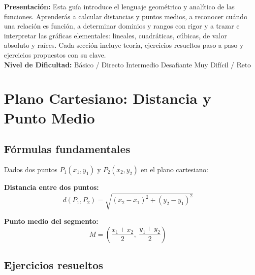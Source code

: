 \documentclass[12pt, letterpaper]{article}
\begin{document}

\vspace{4pt}
\begin{cuadroinfo}
  \small
  \textbf{Presentación:} Esta guía introduce el lenguaje geométrico y analítico de las funciones. Aprenderás a calcular distancias y puntos medios, a reconocer cuándo una relación es función, a determinar dominios y rangos con rigor y a trazar e interpretar las gráficas elementales: lineales, cuadráticas, cúbicas, de valor absoluto y raíces. Cada sección incluye teoría, ejercicios resueltos paso a paso y ejercicios propuestos con su clave.
  \\[4pt]
  \textbf{Nivel de Dificultad:}\quad
  \facil{} Básico / Directo \quad
  \medio{} Intermedio \quad
  \dificil{} Desafiante \quad
  \muyDificil{} Muy Difícil / Reto
\end{cuadroinfo}

\vspace{8pt}

\section{Plano Cartesiano: Distancia y Punto Medio}

\subsection{Fórmulas fundamentales}

\begin{cuadroteoria}
  Dados dos puntos $P_1(x_1, y_1)$ y $P_2(x_2, y_2)$ en el plano cartesiano:

  \textbf{Distancia entre dos puntos:}
  $$d(P_1, P_2) = \sqrt{(x_2 - x_1)^2 + (y_2 - y_1)^2}$$

  \textbf{Punto medio del segmento:}
  $$M = \left(\frac{x_1 + x_2}{2}, \; \frac{y_1 + y_2}{2}\right)$$
\end{cuadroteoria}

\newpage %

\subsection{Ejercicios resueltos}
\end{document}
